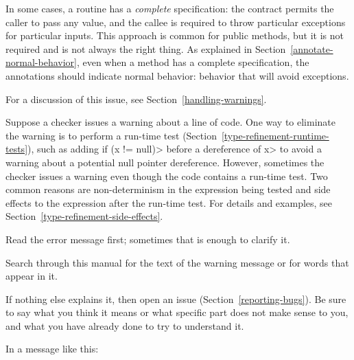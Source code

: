 In some cases, a routine has a \emph{complete} specification:  the contract
permits the caller to pass any value, and the callee is required to throw
particular exceptions for particular inputs.  This approach is common for
public methods, but it is not required and is not always the right thing.
As explained in Section~\ref{annotate-normal-behavior}, even when a method
has a complete specification, the annotations should indicate normal
behavior:  behavior that will avoid exceptions.





For a discussion of this issue, see Section~\ref{handling-warnings}.



Suppose a checker issues a warning about a line of code.  One way to
eliminate the warning is to perform a run-time test
(Section~\ref{type-refinement-runtime-tests}), such as adding \<if (x !=
null)> before a dereference of \<x> to avoid a warning about a potential
null pointer dereference.  However, sometimes the checker issues a warning
even though the code contains a run-time test.  Two common reasons are
non-determinism in the expression being tested and side effects to the
expression after the run-time test.  For details and examples, see
Section~\ref{type-refinement-side-effects}.



Read the error message first; sometimes that is enough to clarify it.

Search through this manual for the text of the warning message or for words
that appear in it.

If nothing else explains it, then
open an issue (Section~\ref{reporting-bugs}).
Be sure to say what you think it means or what specific part does
not make sense to you, and what you have already done to try to understand it.



In a message like this:

